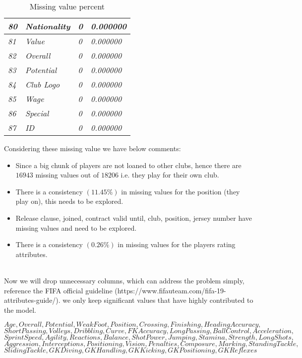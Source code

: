 \documentclass{article}
\begin{document}
\begin{table}[]
\begin{tabular}{|l|l|l|l|}
\textit{80}    & \textit{Nationality}          & \textit{0}             & \textit{0.000000}        \\ \hline
\textit{81}    & \textit{Value}                & \textit{0}             & \textit{0.000000}        \\ \hline
\textit{82}    & \textit{Overall}              & \textit{0}             & \textit{0.000000}        \\ \hline
\textit{83}    & \textit{Potential}            & \textit{0}             & \textit{0.000000}        \\ \hline
\textit{84}    & \textit{Club Logo}            & \textit{0}             & \textit{0.000000}        \\ \hline
\textit{85}    & \textit{Wage}                 & \textit{0}             & \textit{0.000000}        \\ \hline
\textit{86}    & \textit{Special}              & \textit{0}             & \textit{0.000000}        \\ \hline
\textit{87}    & \textit{ID}                   & \textit{0}             & \textit{0.000000}        \\ \hline
\end{tabular}
\caption{Missing value percent}
\end{table}
\newpage


Considering these missing value we have below comments:
\begin{itemize}
    \item Since a big chunk of players are not loaned to other clubs, hence there are $16943$ missing values out of $18206$ i.e. they play for their own club.
    \item There is a consistency $(11.45\%)$ in missing values for the position (they play on), this needs to be explored.
    \item Release clause, joined, contract valid until, club, position, jersey number have missing values and need to be explored.
    \item There is a consistency $(0.26\%)$ in missing values for the players rating attributes.
\end{itemize}
\\
Now we will drop unnecessary columns, which can address the problem simply, reference the FIFA official guideline (https://www.fifauteam.com/fifa-19-attributes-guide/). we only keep significant values that have highly contributed to the model.

\begin{center}
$Age, Overall, Potential, Weak Foot, Position, Crossing, Finishing, HeadingAccuracy,$ \\
$ShortPassing, Volleys, Dribbling, Curve, FKAccuracy, LongPassing, BallControl, Acceleration,$ \\
$SprintSpeed, Agility, Reactions, Balance, ShotPower, Jumping, Stamina, Strength, LongShots,$\\
$Aggression, Interceptions, Positioning, Vision, Penalties, Composure, Marking, StandingTackle,$ \\
$SlidingTackle, GKDiving, GKHandling, GKKicking, GKPositioning, GKReflexes$
\end{center}
\end{document}
